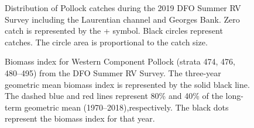 \documentclass[11pt]{book}
\begin{document}
\begin{figure}[htb]

{\centering {} 

}

\caption{Distribution of Pollock catches during the 2019 DFO Summer RV Survey including the Laurentian channel and Georges Bank. Zero catch is represented by the + symbol. Black circles represent catches. The circle area is proportional to the catch size.}\label{fig:31-map-pollock}
\end{figure}

\begin{figure}[htb]

{\centering {} 

}

\caption{Biomass index for Western Component Pollock (strata 474, 476, 480--495) from the DFO Summer RV Survey. The three-year geometric mean biomass index is represented by the solid black line. The dashed blue and red lines represent 80\% and 40\% of the long-term geometric mean (1970--2018),respectively. The black dots represent the biomass index for that year.}\label{fig:32-fig-pollock-biomassWestern}
\end{figure}
\end{document}
